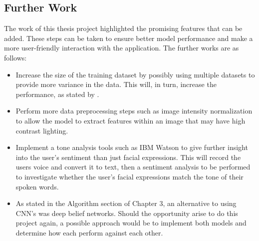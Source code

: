 \subsection{Further Work}
The work of this thesis project highlighted the promising features that can be added. These steps can be taken to ensure better model performance and make a more user-friendly interaction with the application. The further works are as follows:
\begin{itemize}
	\item Increase the size of the training dataset by possibly using multiple datasets to provide more variance in the data. This will, in turn, increase the performance, as stated by \citeauthor{LOPES}.
	\item Perform more data preprocessing steps such as image intensity normalization to allow the model to extract features within an image that may have high contrast lighting.
	\item Implement a tone analysis tools such as IBM Watson to give further insight into the user's sentiment than just facial expressions. This will record the users voice and convert it to text, then a sentiment analysis to be performed to investigate whether the user's facial expressions match the tone of their spoken words.
	\item As stated in the Algorithm section of Chapter 3, an alternative to using CNN's was deep belief networks. Should the opportunity arise to do this project again, a possible approach would be to implement both models and determine how each perform against each other.
\end{itemize}
